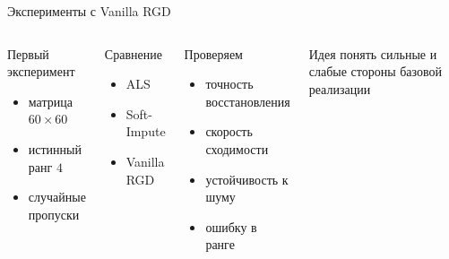 \documentclass[aspectratio=169,xcolor=dvipsnames]{beamer}
\begin{document}
\begin{frame}{Эксперименты с Vanilla RGD}
\small
\begin{columns}[T]
\begin{block}{Первый эксперимент}
\begin{itemize}
\item матрица $60\times 60$
\item истинный ранг $4$
\item случайные пропуски
\end{itemize}
\end{block}

\begin{block}{Сравнение}
\begin{itemize}
\item ALS
\item Soft-Impute
\item Vanilla RGD
\end{itemize}
\end{block}

\begin{block}{Проверяем}
\begin{itemize}
\item точность восстановления
\item скорость сходимости
\item устойчивость к шуму
\item ошибку в ранге
\end{itemize}
\end{block}

\begin{block}{Идея}
понять сильные и слабые стороны базовой реализации
\end{block}
\end{columns}
\end{frame}
\end{document}
